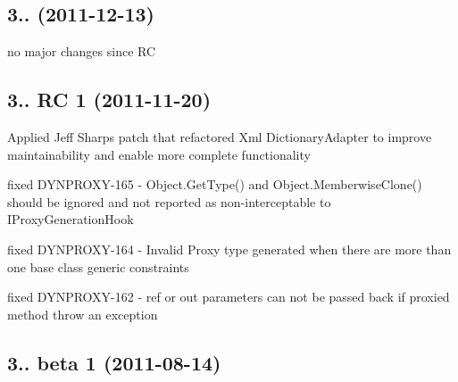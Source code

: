 \subsection*{3.. (2011-\/12-\/13)}


\begin{DoxyItemize}
\item no major changes since RC
\end{DoxyItemize}

\subsection*{3.. RC 1 (2011-\/11-\/20)}


\begin{DoxyItemize}
\item Applied Jeff Sharps patch that refactored Xml Dictionary\+Adapter to improve maintainability and enable more complete functionality
\item fixed D\+Y\+N\+P\+R\+O\+X\+Y-\/165 -\/ Object.\+Get\+Type() and Object.\+Memberwise\+Clone() should be ignored and not reported as non-\/interceptable to I\+Proxy\+Generation\+Hook
\item fixed D\+Y\+N\+P\+R\+O\+X\+Y-\/164 -\/ Invalid Proxy type generated when there are more than one base class generic constraints
\item fixed D\+Y\+N\+P\+R\+O\+X\+Y-\/162 -\/ ref or out parameters can not be passed back if proxied method throw an exception
\end{DoxyItemize}

\subsection*{3.. beta 1 (2011-\/08-\/14)}

